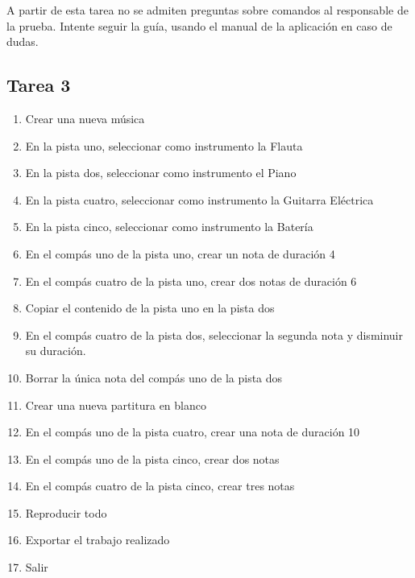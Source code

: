 A partir de esta tarea no se admiten preguntas sobre comandos al responsable de la prueba.
Intente seguir la gu\'ia, usando el manual de la aplicaci\'on en caso de dudas.

\subsection{Tarea 3}

\begin{enumerate}
    \item Crear una nueva m\'usica
    \item En la pista uno, seleccionar como instrumento la Flauta
    \item En la pista dos, seleccionar como instrumento el Piano
    \item En la pista cuatro, seleccionar como instrumento la Guitarra El\'ectrica
    \item En la pista cinco, seleccionar como instrumento la Bater\'ia
    \item En el comp\'as uno de la pista uno, crear un nota de duraci\'on 4
    \item En el comp\'as cuatro de la pista uno, crear dos notas de duraci\'on 6
    \item Copiar el contenido de la pista uno en la pista dos
    \item En el comp\'as cuatro de la pista dos, seleccionar la segunda nota y disminuir su duraci\'on.
    \item Borrar la \'unica nota del comp\'as uno de la pista dos
    \item Crear una nueva partitura en blanco
    \item En el comp\'as uno de la pista cuatro, crear una nota de duraci\'on 10
    \item En el comp\'as uno de la pista cinco, crear dos notas
    \item En el comp\'as cuatro de la pista cinco, crear tres notas
    \item Reproducir todo
    \item Exportar el trabajo realizado
    \item Salir
\end{enumerate}
